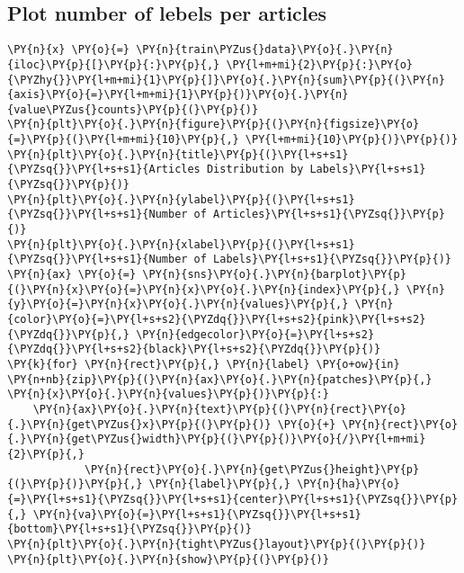 \documentclass[../main.tex]{subfiles}
\begin{document}
    \subsection{Plot number of lebels per
articles}\label{plot-number-of-lebels-per-articles}

    \begin{tcolorbox}[breakable, size=fbox, boxrule=1pt, pad at break*=1mm,colback=cellbackground, colframe=cellborder]
\begin{Verbatim}[commandchars=\\\{\}]
\PY{n}{x} \PY{o}{=} \PY{n}{train\PYZus{}data}\PY{o}{.}\PY{n}{iloc}\PY{p}{[}\PY{p}{:}\PY{p}{,} \PY{l+m+mi}{2}\PY{p}{:}\PY{o}{\PYZhy{}}\PY{l+m+mi}{1}\PY{p}{]}\PY{o}{.}\PY{n}{sum}\PY{p}{(}\PY{n}{axis}\PY{o}{=}\PY{l+m+mi}{1}\PY{p}{)}\PY{o}{.}\PY{n}{value\PYZus{}counts}\PY{p}{(}\PY{p}{)}
\PY{n}{plt}\PY{o}{.}\PY{n}{figure}\PY{p}{(}\PY{n}{figsize}\PY{o}{=}\PY{p}{(}\PY{l+m+mi}{10}\PY{p}{,} \PY{l+m+mi}{10}\PY{p}{)}\PY{p}{)}
\PY{n}{plt}\PY{o}{.}\PY{n}{title}\PY{p}{(}\PY{l+s+s1}{\PYZsq{}}\PY{l+s+s1}{Articles Distribution by Labels}\PY{l+s+s1}{\PYZsq{}}\PY{p}{)}
\PY{n}{plt}\PY{o}{.}\PY{n}{ylabel}\PY{p}{(}\PY{l+s+s1}{\PYZsq{}}\PY{l+s+s1}{Number of Articles}\PY{l+s+s1}{\PYZsq{}}\PY{p}{)}
\PY{n}{plt}\PY{o}{.}\PY{n}{xlabel}\PY{p}{(}\PY{l+s+s1}{\PYZsq{}}\PY{l+s+s1}{Number of Labels}\PY{l+s+s1}{\PYZsq{}}\PY{p}{)}
\PY{n}{ax} \PY{o}{=} \PY{n}{sns}\PY{o}{.}\PY{n}{barplot}\PY{p}{(}\PY{n}{x}\PY{o}{=}\PY{n}{x}\PY{o}{.}\PY{n}{index}\PY{p}{,} \PY{n}{y}\PY{o}{=}\PY{n}{x}\PY{o}{.}\PY{n}{values}\PY{p}{,} \PY{n}{color}\PY{o}{=}\PY{l+s+s2}{\PYZdq{}}\PY{l+s+s2}{pink}\PY{l+s+s2}{\PYZdq{}}\PY{p}{,} \PY{n}{edgecolor}\PY{o}{=}\PY{l+s+s2}{\PYZdq{}}\PY{l+s+s2}{black}\PY{l+s+s2}{\PYZdq{}}\PY{p}{)}
\PY{k}{for} \PY{n}{rect}\PY{p}{,} \PY{n}{label} \PY{o+ow}{in} \PY{n+nb}{zip}\PY{p}{(}\PY{n}{ax}\PY{o}{.}\PY{n}{patches}\PY{p}{,} \PY{n}{x}\PY{o}{.}\PY{n}{values}\PY{p}{)}\PY{p}{:}
    \PY{n}{ax}\PY{o}{.}\PY{n}{text}\PY{p}{(}\PY{n}{rect}\PY{o}{.}\PY{n}{get\PYZus{}x}\PY{p}{(}\PY{p}{)} \PY{o}{+} \PY{n}{rect}\PY{o}{.}\PY{n}{get\PYZus{}width}\PY{p}{(}\PY{p}{)}\PY{o}{/}\PY{l+m+mi}{2}\PY{p}{,}
            \PY{n}{rect}\PY{o}{.}\PY{n}{get\PYZus{}height}\PY{p}{(}\PY{p}{)}\PY{p}{,} \PY{n}{label}\PY{p}{,} \PY{n}{ha}\PY{o}{=}\PY{l+s+s1}{\PYZsq{}}\PY{l+s+s1}{center}\PY{l+s+s1}{\PYZsq{}}\PY{p}{,} \PY{n}{va}\PY{o}{=}\PY{l+s+s1}{\PYZsq{}}\PY{l+s+s1}{bottom}\PY{l+s+s1}{\PYZsq{}}\PY{p}{)}
\PY{n}{plt}\PY{o}{.}\PY{n}{tight\PYZus{}layout}\PY{p}{(}\PY{p}{)}
\PY{n}{plt}\PY{o}{.}\PY{n}{show}\PY{p}{(}\PY{p}{)}
\end{Verbatim}
\end{tcolorbox}
\end{document}
